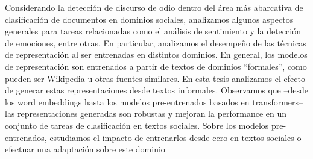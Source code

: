 

Considerando la detección de discurso de odio dentro del área más abarcativa de clasificación de documentos en dominios sociales, analizamos algunos aspectos generales para tareas relacionadas como el análisis de sentimiento y la detección de emociones, entre otras. En particular, analizamos el desempeño de las técnicas de representación al ser entrenadas en distintos dominios. En general, los modelos de representación son entrenados a partir de textos de dominios “formales”, como pueden ser Wikipedia u otras fuentes similares. En esta tesis analizamos el efecto de generar estas representaciones desde textos informales. Observamos que –desde los word embeddings hasta los modelos pre-entrenados basados en transformers– las representaciones generadas son robustas y mejoran la performance en un conjunto de tareas de clasificación en textos sociales. Sobre los modelos pre-entrenados, estudiamos el impacto de entrenarlos desde cero en textos sociales o efectuar una adaptación sobre este dominio

